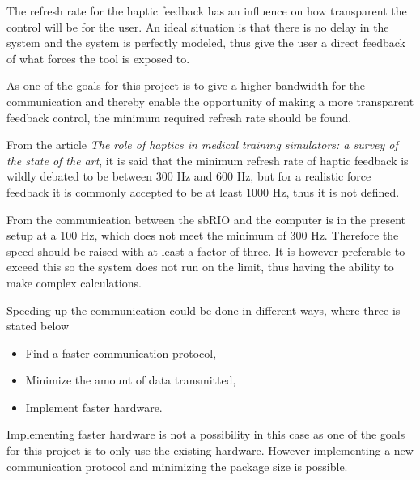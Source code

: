 
The refresh rate for the haptic feedback has an influence on how transparent the control will be for the user. An ideal situation is that there is no delay in the system and the system is perfectly modeled, thus give the user a direct feedback of what forces the tool is exposed to. 

As one of the goals for this project is to give a higher bandwidth for the communication and thereby enable the opportunity of making a more transparent feedback control, the minimum required refresh rate should be found.

From the article \textit{The role of haptics in medical training simulators: a survey of the state of the art}\cite{coles2011role}, it is said that the minimum refresh rate of haptic feedback is wildly debated to be between 300 Hz and 600 Hz, but for a realistic force feedback it is commonly accepted to be at least 1000 Hz, thus it is not defined. 

From   the communication between the sbRIO and the computer is in the present setup at a 100 Hz, which does not meet the minimum of 300 Hz. Therefore the speed should be raised with at least a factor of three. It is however preferable to exceed this so the system does not run on the limit, thus having the ability to make complex calculations.

Speeding up the communication could be done in different ways, where three is stated below

\begin{itemize}
	\item Find a faster communication protocol,
	\item Minimize the amount of data transmitted,
	\item Implement faster hardware.	
\end{itemize}

Implementing faster hardware is not a possibility in this case as one of the goals for this project is to only use the existing hardware.
However implementing a new communication protocol and minimizing the package size is possible.
